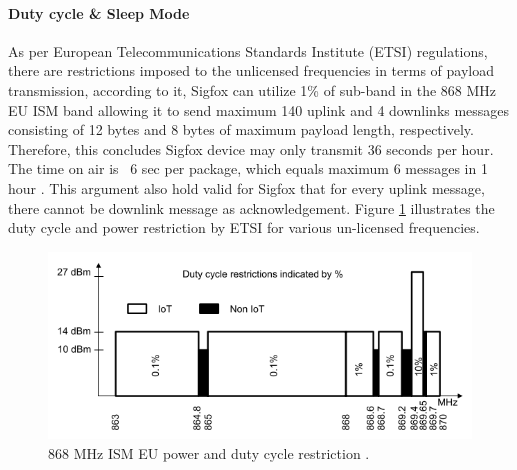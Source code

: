 \documentclass[12pt]{article}
\begin{document}
\paragraph{Duty cycle \& Sleep Mode}
As per European Telecommunications Standards Institute (ETSI) regulations, there are restrictions imposed to the unlicensed frequencies in terms of payload transmission, according to it, Sigfox can utilize 1\% of sub-band in the 868 MHz EU ISM band \cite{etsi2012electromagnetic} allowing it to send maximum 140 uplink and 4 downlinks messages consisting of 12 bytes and 8 bytes of maximum payload length, respectively. Therefore, this concludes Sigfox device may only transmit 36 seconds per hour. The time on air is ~6 sec per package, which equals maximum 6 messages in 1 hour \cite{vejlgaard2017coverage,SigfoxTechnicalDoc,securitysigfoxwhitepaper}. This argument also hold valid for Sigfox that for every uplink message, there cannot be downlink message as acknowledgement. Figure \ref{fig:ETSI duty Cycle and Power restriction} illustrates the duty cycle and power restriction by ETSI for various un-licensed frequencies.\par


\begin{figure}[H]
  \includegraphics[width=\textwidth]{Images/duty_cycleLPWAN.png}
  \centering
  \caption{868 MHz ISM EU power and duty cycle restriction  \cite{etsi2012electromagnetic}.}
  \label{fig:ETSI duty Cycle and Power restriction}
\end{figure}
\end{document}
